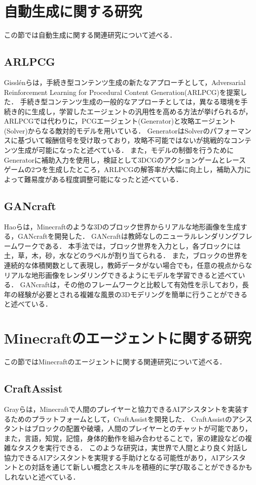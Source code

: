 \section{自動生成に関する研究}
この節では自動生成に関する関連研究について述べる．

\subsection{ARLPCG}
Gisslénらは，手続き型コンテンツ生成の新たなアプローチとして，Adversarial Reinforcement Learning for Procedural Content Generation(ARLPCG)を提案した\cite{bib:arlpcg}．
手続き型コンテンツ生成の一般的なアプローチとしては，異なる環境を手続き的に生成し，学習したエージェントの汎用性を高める方法が挙げられるが，ARLPCGでは代わりに，PCGエージェント(Generator)と攻略エージェント(Solver)からなる敵対的モデルを用いている．
GeneratorはSolverのパフォーマンスに基づいて報酬信号を受け取っており，攻略不可能ではないが挑戦的なコンテンツ生成が可能になったと述べている．
また，モデルの制御を行うためにGeneratorに補助入力を使用し，検証として3DCGのアクションゲームとレースゲームの2つを生成したところ，ARLPCGの解答率が大幅に向上し，補助入力によって難易度がある程度調整可能になったと述べている．

\subsection{GANcraft}\label{sec:gancraft}
Haoらは，Minecraftのような3Dのブロック世界からリアルな地形画像を生成する，GANcraftを開発した\cite{bib:gancraft}．
GANcraftは教師なしのニューラルレンダリングフレームワークである．
本手法では，ブロック世界を入力とし，各ブロックには土，草，木，砂，水などのラベルが割り当てられる．
また，ブロックの世界を連続的な体積関数として表現し，教師データがない場合でも，任意の視点からなリアルな地形画像をレンダリングできるようにモデルを学習できると述べている．
GANcraftは，その他のフレームワークと比較して有効性を示しており，長年の経験が必要とされる複雑な風景の3Dモデリングを簡単に行うことができると述べている．

\section{Minecraftのエージェントに関する研究}
この節ではMinecraftのエージェントに関する関連研究について述べる．

\subsection{CraftAssist}
Grayらは，Minecraftで人間のプレイヤーと協力できるAIアシスタントを実装するためのプラットフォームとして，CraftAssistを開発した\cite{bib:craft_assist}．
CraftAssistのアシスタントはブロックの配置や破壊，人間のプレイヤーとのチャットが可能であり，また，言語，知覚，記憶，身体的動作を組み合わせることで，家の建設などの複雑なタスクを実行できる．
このような研究は，実世界で人間とより良く対話し協力できるAIアシスタントを実現する手助けとなる可能性があり，AIアシスタントとの対話を通じて新しい概念とスキルを積極的に学び取ることができるかもしれないと述べている．

